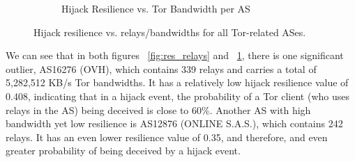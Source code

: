 \begin{figure}[ht!]
\begin{subfigure}{.25\textwidth}
  \caption{Hijack Resilience vs. Tor Bandwidth per AS}
  \label{fig:hijack_bw}
\end{subfigure}
\caption{Hijack resilience vs. relays/bandwidths for all Tor-related ASes.}
\label{fig:hijack_as}
\end{figure}

We can see that in both figures ~\ref{fig:res_relays} and ~\ref{fig:hijack_bw}, there is one significant outlier, AS16276 (OVH), which contains 339 relays and carries a total of 5,282,512 KB/s Tor bandwidths. It has a relatively low hijack resilience value of 0.408, indicating that in a hijack event, the probability of a Tor client (who uses relays in the AS) being deceived is close to 60\%. Another AS with high bandwidth yet low resilience is AS12876 (ONLINE S.A.S.), which contains 242 relays. It has an even lower resilience value of 0.35, and therefore, and even greater probability of being deceived by a hijack event. \\




%


